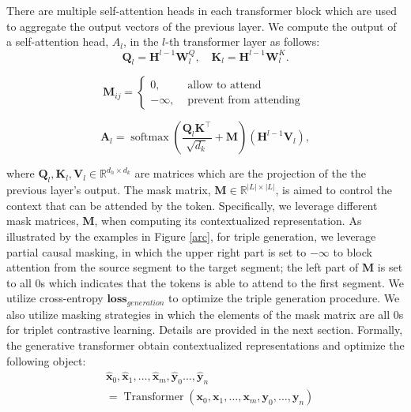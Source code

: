 \documentclass[letterpaper]{article} \usepackage{aaai21}  \usepackage{times}  \usepackage{helvet} \usepackage{courier}  \usepackage[hyphens]{url}  \usepackage{graphicx} \urlstyle{rm} \def\UrlFont{\rm}  \usepackage{natbib}  \usepackage[noend]{algpseudocode}
\begin{document}
There are multiple self-attention heads in each transformer block which are used to aggregate the output vectors of the previous layer. We compute the output of a self-attention head, $A_l$, in the $l$-th transformer layer as follows:
\begin{equation}
    \mathbf{Q}_{l}=\mathbf{H}^{l-1} \mathbf{W}_{l}^{Q}, \quad \mathbf{K}_{l}=\mathbf{H}^{l-1} \mathbf{W}_{l}^{K}.
\end{equation}

\begin{equation}
\mathbf{M}_{i j}=\left\{\begin{array}{ll}0, & \text { allow to attend } \\ -\infty, & \text { prevent from attending }\end{array}\right.
\end{equation}

\begin{equation}
    \textbf{$\mathbf{A}_{l}=\operatorname{softmax}\left(\frac{\mathbf{Q}_{l} \mathbf{K}^{\top}}{\sqrt{d_{k}}}+\mathbf{M}\right)\left(\mathbf{H}^{l-1} \mathbf{V}_{l}\right)$},
\end{equation}

where $\mathbf{Q}_{l}, \mathbf{K}_{l}, \mathbf{V}_{l} \in \mathbb{R}^{d_{h} \times d_{k}}$ are  matrices which are the  projection of the the previous layer’s output.
The mask matrix, $\mathbf{M} \in \mathbb{R}^{|L| \times|L|}$, is aimed to control the context that can be attended by the token. Specifically, we leverage different mask matrices, $\mathbf{M}$,  when computing its contextualized representation. 
As illustrated by the examples in Figure \ref{arc}, for triple generation, we leverage partial causal masking, in which  the upper right part is set to $-\infty$ to block attention from the source segment to the target segment; the left part of $\mathbf{M}$ is set to all $0$s which indicates that the tokens is able to attend to the first segment. We utilize cross-entropy $\mathbf{loss}_{generation}$ to optimize the triple generation procedure. We also utilize masking strategies in which the elements of the mask matrix are all $0$s for triplet contrastive learning. Details are provided in the next section. Formally, the generative transformer obtain contextualized representations and optimize the following object:
\begin{equation}\begin{split}
    &\hat{\mathbf{x}}_{0}, \hat{\mathbf{x}}_{1}, \ldots, \hat{\mathbf{x}}_{m}, \hat{\mathbf{y}}_{0} \ldots, \hat{\mathbf{y}}_{n} \\
    &=\operatorname{Transformer}\left(\mathbf{x}_{0}, \mathbf{x}_{1}, \ldots, \mathbf{x}_{m}, \mathbf{y}_{0}, \ldots, \mathbf{y}_{n}\right)
    \end{split}
\end{equation}
\end{document}
